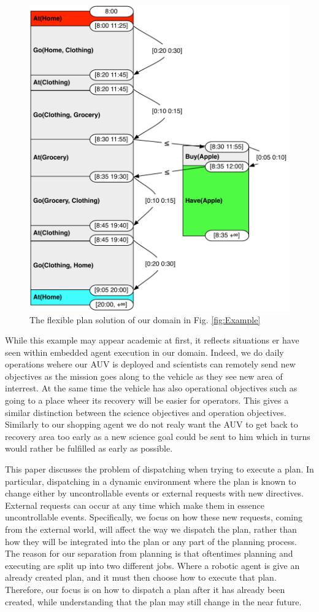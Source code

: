 \begin{figure}
  \centering
  \includegraphics[width=0.8\columnwidth]{figs/example_plan}
  \caption{The flexible plan solution of our domain in
    Fig. \ref{fig:Example}}
  \label{fig:ex:plan}
\end{figure}

While this example may appear academic at first, it reflects situations
er have seen within embedded agent execution in our domain. Indeed, we
do daily operations wehere our AUV is deployed and scientists can
remotely send new objectives as the mission goes along to the vehicle
as they see new area of interrest. At the same time the vehicle has
also operational objectives such as going to a place wheer its
recovery will be easier for operators. This gives a similar
distinction between the science objectives and operation
objectives. Similarly to our shopping agent we do not realy want the
AUV to get back to recovery area too early as a new science goal could
be sent to him which in turns would rather be fulfilled as early as
possible.

This paper discusses the problem of dispatching when trying to execute
a plan. In particular, dispatching in a dynamic environment where the
plan is known to change either by uncontrollable events or external
requests with new directives. External requests  can occur
at any time which make them in essence uncontrollable events.
Specifically, we focus on how these new requests, coming from the
external world, will affect the way we dispatch the plan, rather than
how they will be integrated into the plan or any part of the planning
process.  The reason for our separation from planning is that
oftentimes planning and executing are split up into two different
jobs. Where a robotic agent is give an already created plan, and it
must then choose how to execute that plan. Therefore, our focus is on
how to dispatch a plan after it has already been created, while
understanding that the plan may still change in the near future.

